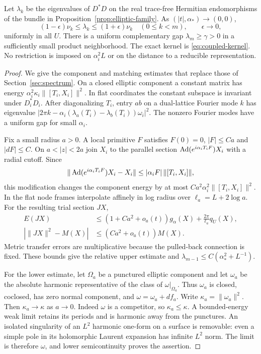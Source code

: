\begin{theorem}\label{thm:coupled-spectrum}
Let $\lambda_k$ be the eigenvalues of $D^*D$
on the real trace-free Hermitian endomorphisms
of the bundle in Proposition~\ref{prop:elliptic-family}.
As $(|t|,\alpha_*)\to(0,0)$,
\[
 (1-\epsilon)\nu_k\le\lambda_k\le(1+\epsilon)\nu_k
 \quad(0\le k<m),\qquad \epsilon\longrightarrow0,
\]
uniformly in all $U$. There is a uniform
complementary gap $\lambda_m\ge\gamma>0$
in a sufficiently small product neighborhood.
The exact kernel is \eqref{eq:coupled-kernel}.
No restriction is imposed on $\alpha_i^2L$
or on the distance to a reducible representation.
\end{theorem}
\begin{proof}
We give the component and matching estimates
that replace those of Section~\ref{sec:spectrum}.
On a closed elliptic component a constant
matrix has energy
$\alpha_i^2\kappa_i\|[T_i,X_i]\|^2$.
In flat coordinates the constant subspace is
invariant under $D_i^*D_i$. After diagonalizing
$T_i$, entry $ab$ on a dual-lattice Fourier
mode $k$ has eigenvalue
$|2\pi k-\alpha_i(\lambda_a(T_i)-\lambda_b(T_i))
\omega_i|^2$. The nonzero Fourier modes have
a uniform gap for small $\alpha_i$.

Fix a small radius $a>0$. A local primitive
$F$ satisfies $F(0)=0$, $|F|\le Ca$ and
$|dF|\le C$. On $a<|z|<2a$ join $X_i$ to
the parallel section $\operatorname{Ad}(e^{i\alpha_iT_iF})X_i$
with a radial cutoff. Since
\[
 \|\operatorname{Ad}(e^{i\alpha_iT_iF})X_i-X_i\|
 \le|\alpha_iF|\,\|[T_i,X_i]\|,
\]
this modification changes the component
energy by at most $Ca^2\alpha_i^2
\|[T_i,X_i]\|^2$. In the flat node frames
interpolate affinely in log radius over
$\ell_a=L+2\log a$.
For the resulting trial section $JX$,
\[
 \begin{split}
 E(JX)&\le(1+Ca^2+o_a(t))g_\alpha(X)
                         +\frac{2\pi}{\ell_a}q_U(X),\\
 |\|JX\|^2-M(X)|&\le(Ca^2+o_a(t))M(X).
 \end{split}
\]
Metric transfer errors are multiplicative
because the pulled-back connection is fixed.
These bounds give the relative upper
estimate and $\lambda_{m-1}\le
C(\alpha_*^2+L^{-1})$.

For the lower estimate, let $\Omega_a$ be a
punctured elliptic component and let $\omega_a$
be the absolute harmonic representative of
the class of $\omega|_{\Omega_a}$.
Thus $\omega_a$ is closed, coclosed, has zero
normal component, and
$\omega=\omega_a+df_a$. Write
$\kappa_a=\|\omega_a\|^2$. Then
$\kappa_a\to\kappa$ as $a\to0$.
Indeed $\omega$ is a competitor, so
$\kappa_a\le\kappa$. A bounded-energy weak
limit retains its periods and is harmonic
away from the punctures. An isolated
singularity of an $L^2$ harmonic one-form
on a surface is removable: even a simple
pole in its holomorphic Laurent expansion
has infinite $L^2$ norm. The limit is
therefore $\omega$, and lower
semicontinuity proves the assertion.


\end{proof}
